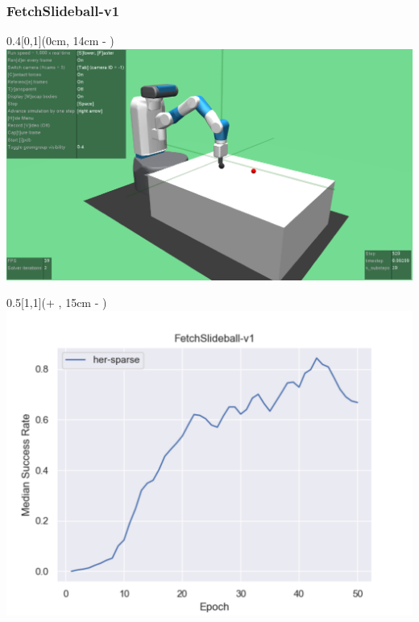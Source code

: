 


\begin{frame}
	\frametitle{FetchSlideball-v1}	
	\vspace{1cm}
	
	\begin{textblock*}{0.4\paperwidth}[0,1](0cm, 14cm - \PraesentationSeitenrand)%
		\includegraphics[width=0.4\paperwidth]{./Ressourcen/Figures/FetchSlideball-v1.pdf}
	\end{textblock*}
	
	\begin{textblock*}{0.5\paperwidth}[1,1](\textwidth + \PraesentationSeitenrand, 15cm - \PraesentationSeitenrand)%
		\includegraphics[width=0.5\paperwidth]{./Ressourcen/Figures/fig_FetchSlideball-v1.pdf}
	\end{textblock*}
	
\end{frame}
\clearpage


